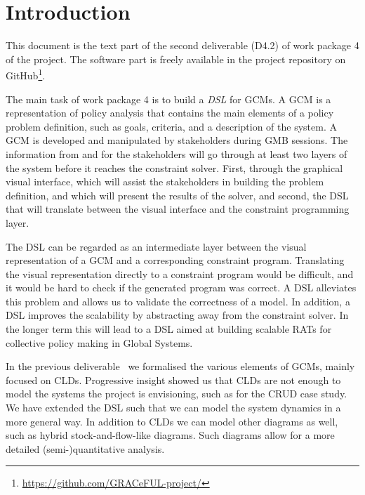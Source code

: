 \section{Introduction}\label{introduction}

This document is the text part of the second deliverable (D4.2) of
work package 4 of the \grace project.
%
The software part is freely available in the project repository on
GitHub\footnote{\url{https://github.com/GRACeFUL-project/}}.

The main task of work package 4 is to build a \emph{\ac{DSL}} for
\acp{GCM}.
%
A \ac{GCM} is a representation of policy analysis that contains the
main elements of a policy problem definition, such as goals, criteria,
and a description of the system.
%
A \ac{GCM} is developed and manipulated by stakeholders during
\ac{GMB} sessions.
%
The information from and for the stakeholders will go through at least
two layers of the \grace system before it reaches the constraint
solver.
%
First, through the graphical visual interface, which will assist the
stakeholders in building the problem definition, and which will
present the results of the solver, and second, the \ac{DSL} that
will translate between the visual interface and the constraint
programming layer.

The \ac{DSL} can be regarded as an intermediate layer between the
visual representation of a \acf{GCM} and a corresponding constraint
program.
%
Translating the visual representation directly to a constraint program
would be difficult, and it would be hard to check if the generated
program was correct.
%
A DSL alleviates this problem and allows us to validate the
correctness of a model.
%
In addition, a \ac{DSL} improves the scalability by abstracting away
from the constraint solver.
%
In the longer term this will lead to a \ac{DSL} aimed at building
scalable \acp{RAT} for collective policy making in Global Systems.


In the previous deliverable~\cite{D4.1} we formalised the various
elements of \acp{GCM}, mainly focused on \acp{CLD}.
%
Progressive insight showed us that \acp{CLD} are not enough to model
the systems the project is envisioning, such as for the \ac{CRUD} case
study.
%
We have extended the \ac{DSL} such that we can model the system 
dynamics in a more general way. In addition to \aclp{CLD} we can
model other diagrams as well, such as hybrid stock-and-flow-like 
diagrams.
%
Such diagrams allow for a more detailed (semi-)quantitative
analysis.

